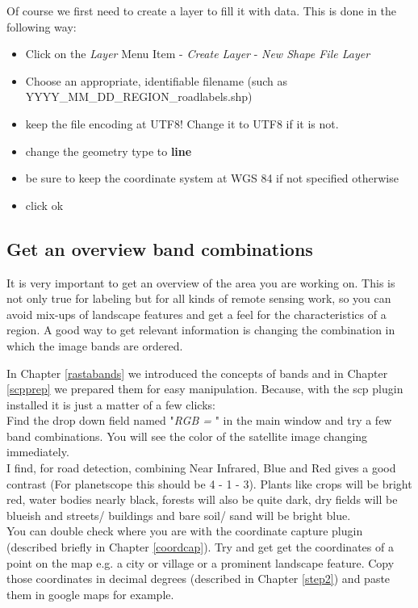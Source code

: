 \documentclass[12pt,a4paper]{scrartcl}
\begin{document}
Of course we first need to create a layer to fill it with data. This is done in the following way:  

\begin{itemize}
\item Click on the \textit{Layer} Menu Item - \textit{Create Layer} - \textit{New Shape File Layer}
\item Choose an appropriate, identifiable filename (such as YYYY\_MM\_DD\_REGION\_roadlabels.shp) 
\item keep the file encoding at UTF8! Change it to UTF8 if it is not.
\item change the geometry type to \textbf{line}
\item be sure to keep the coordinate system at WGS 84 if not specified otherwise
\item click ok
\end{itemize}

\subsection{Get an overview \newline band combinations}

It is very important to get an overview of the area you are working on. 
This is not only true for labeling but for all kinds of remote sensing work, so you can avoid mix-ups of landscape features and get a feel for the characteristics of a region.  
A good way to get relevant information is changing the combination in which the image bands are ordered.

In Chapter \ref{rastabands} we introduced the concepts of bands and in Chapter \ref{scpprep} we prepared them 
for easy manipulation. 
Because, with the scp plugin installed it is just a matter of a few clicks: \\
Find the drop down field named "\textit{RGB =        }" in the main window and try a few band combinations.  
You will see the color of the satellite image changing immediately.\\

I find, for road detection, combining Near Infrared, Blue and Red gives a good contrast (For planetscope this should be 4 - 1 - 3).
Plants like crops will be bright red, water bodies nearly black, forests will also be quite dark, dry 
fields will be blueish and streets/ buildings and bare soil/ sand will be bright blue.\\

You can double check where you are with the coordinate capture plugin (described briefly in Chapter \ref{coordcap}).
Try and get get the coordinates of a point on the map e.g. a city or village or a prominent landscape feature. 
Copy those coordinates in decimal degrees (described in Chapter \ref{step2}) and paste them in google maps for example.\\
\end{document}
